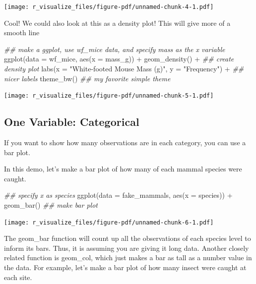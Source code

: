 \documentclass[
  letterpaper,
  DIV=11,
  numbers=noendperiod]{scrreprt}
\newenvironment{Shaded}{\begin{snugshade}}{\end{snugshade}}
\newcommand{\AttributeTok}[1]{\textcolor[rgb]{0.40,0.45,0.13}{#1}}
\newcommand{\DocumentationTok}[1]{\textcolor[rgb]{0.37,0.37,0.37}{\textit{#1}}}
\newcommand{\FunctionTok}[1]{\textcolor[rgb]{0.28,0.35,0.67}{#1}}
\newcommand{\NormalTok}[1]{\textcolor[rgb]{0.00,0.23,0.31}{#1}}
\newcommand{\SpecialCharTok}[1]{\textcolor[rgb]{0.37,0.37,0.37}{#1}}
\newcommand{\StringTok}[1]{\textcolor[rgb]{0.13,0.47,0.30}{#1}}
\begin{document}
\texttt{[image: r\_visualize\_files/figure-pdf/unnamed-chunk-4-1.pdf]}

Cool! We could also look at this as a density plot! This will give more
of a smooth line

\begin{Shaded}
\begin{Highlighting}[]
\DocumentationTok{\#\# make a ggplot, use wf\_mice data, and specify mass as the x variable}
\FunctionTok{ggplot}\NormalTok{(}\AttributeTok{data =}\NormalTok{ wf\_mice, }\FunctionTok{aes}\NormalTok{(}\AttributeTok{x =}\NormalTok{ mass\_g)) }\SpecialCharTok{+}
  \FunctionTok{geom\_density}\NormalTok{() }\SpecialCharTok{+} \DocumentationTok{\#\# create density plot}
  \FunctionTok{labs}\NormalTok{(}\AttributeTok{x =} \StringTok{"White{-}footed Mouse Mass (g)"}\NormalTok{, }\AttributeTok{y =} \StringTok{"Frequency"}\NormalTok{) }\SpecialCharTok{+} \DocumentationTok{\#\# nicer labels}
  \FunctionTok{theme\_bw}\NormalTok{() }\DocumentationTok{\#\# my favorite simple theme}
\end{Highlighting}
\end{Shaded}

\texttt{[image: r\_visualize\_files/figure-pdf/unnamed-chunk-5-1.pdf]}

\subsection{One Variable: Categorical}\label{one-variable-categorical}

If you want to show how many observations are in each category, you can
use a bar plot.

In this demo, let's make a bar plot of how many of each mammal species
were caught.

\begin{Shaded}
\begin{Highlighting}[]
\DocumentationTok{\#\# specify x as species}
\FunctionTok{ggplot}\NormalTok{(}\AttributeTok{data =}\NormalTok{ fake\_mammals, }\FunctionTok{aes}\NormalTok{(}\AttributeTok{x =}\NormalTok{ species)) }\SpecialCharTok{+}
  \FunctionTok{geom\_bar}\NormalTok{() }\DocumentationTok{\#\# make bar plot}
\end{Highlighting}
\end{Shaded}

\texttt{[image: r\_visualize\_files/figure-pdf/unnamed-chunk-6-1.pdf]}

The geom\_bar function will count up all the observations of each
species level to inform its bars. Thus, it is assuming you are giving it
long data. Another closely related function is geom\_col, which just
makes a bar as tall as a number value in the data. For example, let's
make a bar plot of how many insect were caught at each site.
\end{document}
